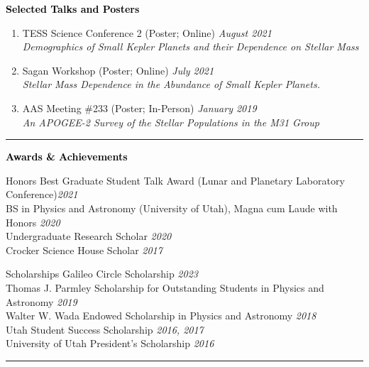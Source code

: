 \documentclass{resume} %
\newcommand{\mystrut}{\rule[-.3\baselineskip]{0pt}{\baselineskip}}
\newcommand{\cvline}[1]{\vspace*{\dimexpr-\parskip-0.3\baselineskip}\noindent\rule{\textwidth}{0.4pt}\vspace*{\dimexpr-0.3\parskip-0\baselineskip}}
\renewenvironment{rSection}[1]{\mystrut{\textcolor{black}{{\large{\textbf{#1}}}}}
\vspace{-5pt} %
\begin{list}{}{
\setlength{\leftmargin}{0em}
}
\item[]
}{
\end{list}
}
\begin{document}
\begin{rSection}{Selected Talks and Posters}
\begin{enumerate}
\item{TESS Science Conference 2 (Poster; Online)} \hfill {\em August 2021} \\
\textit{Demographics of Small Kepler Planets and their Dependence on Stellar Mass}

\item{Sagan Workshop (Poster; Online)} \hfill {\em July 2021} \\
\textit{Stellar Mass Dependence in the Abundance of Small Kepler Planets.}

\item{AAS Meeting \#233 (Poster; In-Person)} \hfill {\em January 2019} \\
\textit{An APOGEE-2 Survey of the Stellar Populations in the M31 Group}

\end{enumerate}
\end{rSection}
\cvline{}


\begin{rSection}{Awards \& Achievements} \itemsep -2pt
\begin{rSubsection}{Honors}{}{}{}
{Best Graduate Student Talk Award (Lunar and Planetary Laboratory Conference)\hfill {\em 2021}}\\
{BS in Physics and Astronomy (University of Utah), Magna cum Laude with Honors \hfill {\em 2020}}\\
{Undergraduate Research Scholar \hfill {\em 2020}}\\
{Crocker Science House Scholar \hfill {\em 2017}}
\end{rSubsection}
\begin{rSubsection}{Scholarships}{}{}{}
Galileo Circle Scholarship \hfill {\em 2023}\\
{Thomas J. Parmley Scholarship for Outstanding Students in Physics and Astronomy \hfill {\em 2019}}\\
{Walter W. Wada Endowed Scholarship in Physics and Astronomy \hfill {\em 2018}}\\
{Utah Student Success Scholarship \hfill {\em 2016, 2017}}\\
{University of Utah President’s Scholarship \hfill {\em 2016}}
\end{rSubsection}
\vspace{0.5em}
\end{rSection}
\cvline{}
\end{document}
